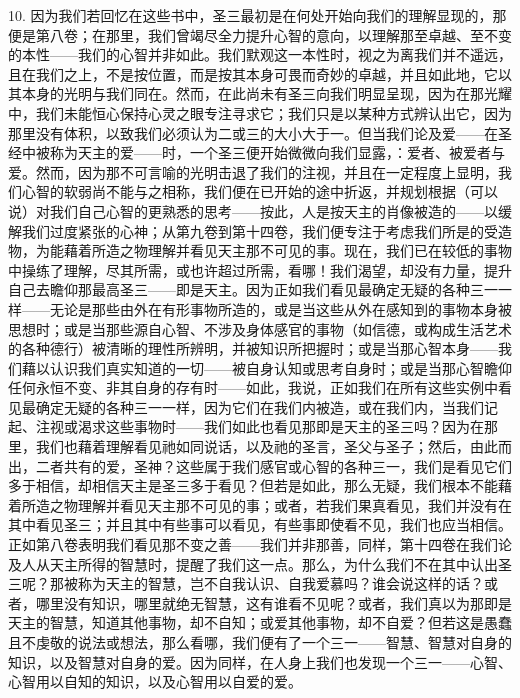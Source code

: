 10. 因为我们若回忆在这些书中，圣三最初是在何处开始向我们的理解显现的，那便是第八卷；在那里，我们曾竭尽全力提升心智的意向，以理解那至卓越、至不变的本性——我们的心智并非如此。我们默观这一本性时，视之为离我们并不遥远，且在我们之上，不是按位置，而是按其本身可畏而奇妙的卓越，并且如此地，它以其本身的光明与我们同在。然而，在此尚未有圣三向我们明显呈现，因为在那光耀中，我们未能恒心保持心灵之眼专注寻求它；我们只是以某种方式辨认出它，因为那里没有体积，以致我们必须认为二或三的大小大于一。但当我们论及爱——在圣经中被称为天主的爱——时，一个圣三便开始微微向我们显露，：爱者、被爱者与爱。然而，因为那不可言喻的光明击退了我们的注视，并且在一定程度上显明，我们心智的软弱尚不能与之相称，我们便在已开始的途中折返，并规划根据（可以说）对我们自己心智的更熟悉的思考——按此，人是按天主的肖像被造的——以缓解我们过度紧张的心神；从第九卷到第十四卷，我们便专注于考虑我们所是的受造物，为能藉着所造之物理解并看见天主那不可见的事。现在，我们已在较低的事物中操练了理解，尽其所需，或也许超过所需，看哪！我们渴望，却没有力量，提升自己去瞻仰那最高圣三——即是天主。因为正如我们看见最确定无疑的各种三一一样——无论是那些由外在有形事物所造的，或是当这些从外在感知到的事物本身被思想时；或是当那些源自心智、不涉及身体感官的事物（如信德，或构成生活艺术的各种德行）被清晰的理性所辨明，并被知识所把握时；或是当那心智本身——我们藉以认识我们真实知道的一切——被自身认知或思考自身时；或是当那心智瞻仰任何永恒不变、非其自身的存有时——如此，我说，正如我们在所有这些实例中看见最确定无疑的各种三一一样，因为它们在我们内被造，或在我们内，当我们记起、注视或渴求这些事物时——我们如此也看见那即是天主的圣三吗？因为在那里，我们也藉着理解看见祂如同说话，以及祂的圣言，圣父与圣子；然后，由此而出，二者共有的爱，圣神？这些属于我们感官或心智的各种三一，我们是看见它们多于相信，却相信天主是圣三多于看见？但若是如此，那么无疑，我们根本不能藉着所造之物理解并看见天主那不可见的事；或者，若我们果真看见，我们并没有在其中看见圣三；并且其中有些事可以看见，有些事即使看不见，我们也应当相信。正如第八卷表明我们看见那不变之善——我们并非那善，同样，第十四卷在我们论及人从天主所得的智慧时，提醒了我们这一点。那么，为什么我们不在其中认出圣三呢？那被称为天主的智慧，岂不自我认识、自我爱慕吗？谁会说这样的话？或者，哪里没有知识，哪里就绝无智慧，这有谁看不见呢？或者，我们真以为那即是天主的智慧，知道其他事物，却不自知；或爱其他事物，却不自爱？但若这是愚蠢且不虔敬的说法或想法，那么看哪，我们便有了一个三一——智慧、智慧对自身的知识，以及智慧对自身的爱。因为同样，在人身上我们也发现一个三一——心智、心智用以自知的知识，以及心智用以自爱的爱。\par


